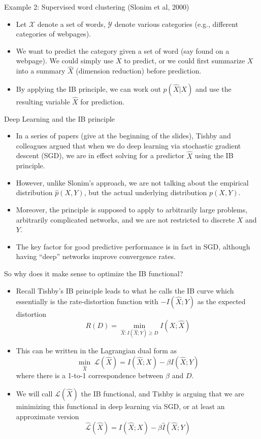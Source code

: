 \documentclass{beamer}
\begin{document}
\begin{frame}{Example 2: Supervised word clustering (Slonim et al, 2000)}
\begin{itemize}
	\item Let $\mathcal{X}$ denote a set of words, $\mathcal{Y}$ denote various categories (e.g., different categories of webpages). 
	\item We want to predict the category given a set of word (say found on a webpage). We could simply use $X$ to predict, or we could first summarize $X$ into a summary $\hat{X}$ (dimension reduction) before prediction. 
	\item By applying the IB principle, we can work out $p(\hat{X}|X)$ and use the resulting variable $\hat{X}$ for prediction. 
\end{itemize}
\end{frame}

\begin{frame}{Deep Learning and the IB principle}
\begin{itemize}
	\item In a series of papers (give at the beginning of the slides), Tishby and colleagues argued that when we do deep learning via stochastic gradient descent (SGD), we are in effect solving for a predictor $\hat{X}$ using the IB principle.
	\item However, unlike Slonim's approach, we are not talking about the empirical distribution $\hat{p}(X,Y)$, but the actual underlying distribution $p(X,Y)$. 
	\item Moreover, the principle is supposed to apply to arbitrarily large problems, arbitrarily complicated networks, and we are not restricted to discrete $X$ and $Y$. 
	\item The key factor for good predictive performance is in fact in SGD, although having ``deep'' networks improve convergence rates. 
\end{itemize}
\end{frame}

\begin{frame}{So why does it make sense to optimize the IB functional?}
\begin{itemize}
	\item Recall Tishby's IB principle leads to what he calls the IB curve which essentially is the rate-distortion function with $-I(\hat{X};Y)$ as the expected distortion 
	\[
		R(D) = \underset{\hat{X}: I(\hat{X};Y) \geq D }{\min} I(X; \hat{X})
	\]
	\item This can be written in the Lagrangian dual form as 
	\[
		\underset{\hat{X}}{\min}\ \mathcal{L}(\hat{X}) = I(\hat{X};X) - \beta I(\hat{X};Y)
	\]
	where there is a 1-to-1 correspondence between $\beta$ and $D$. 
	\item We will call $\mathcal{L}(\hat{X})$ the IB functional, and Tishby is arguing that we are minimizing this functional in deep learning via SGD, or at least an approximate version 
	\[
		\hat{\mathcal{L}}(\hat{X}) = I(\hat{X};X) - \beta \hat{I}(\hat{X};Y)
	\] 
\end{itemize}
\end{frame}
\end{document}
